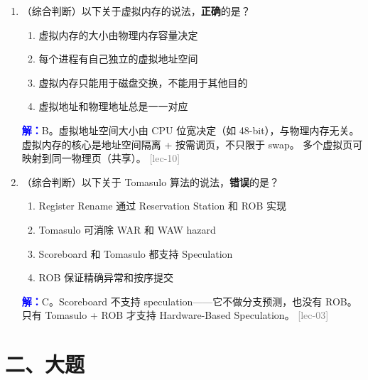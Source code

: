 \documentclass[11pt,a4paper]{article}
\newcommand{\ans}{\par\noindent\textcolor{blue}{\textbf{解：}}}
\newcommand{\lec}[1]{\textcolor{gray}{[lec-#1]}}
\begin{document}
\begin{enumerate}[leftmargin=*,itemsep=8pt]
  \begin{enumerate}[label=\Alph*.]
    \item 一个页表
    \item 一个缓存主存数据的 buffer（cache）
    \item 一个缓存虚拟地址到物理地址映射关系（PTE）的 buffer（cache）
    \item 一种页替换算法
  \end{enumerate}

  \ans C。TLB（Translation Lookaside Buffer）是页表的专用 cache，
  缓存最近使用过的 PTE（VPN $\to$ PPN 映射），加速地址翻译。
  它不存数据内容（B 错），不是页表本身（A 错），也不是替换算法（D 错）。 \lec{11}

\item （综合判断）以下关于虚拟内存的说法，\textbf{正确}的是？

  \begin{enumerate}[label=\Alph*.]
    \item 虚拟内存的大小由物理内存容量决定
    \item 每个进程有自己独立的虚拟地址空间
    \item 虚拟内存只能用于磁盘交换，不能用于其他目的
    \item 虚拟地址和物理地址总是一一对应
  \end{enumerate}

  \ans B。虚拟地址空间大小由 CPU 位宽决定（如 48-bit），与物理内存无关。
  虚拟内存的核心是地址空间隔离 + 按需调页，不只限于 swap。
  多个虚拟页可映射到同一物理页（共享）。 \lec{10}

\item （综合判断）以下关于 Tomasulo 算法的说法，\textbf{错误}的是？

  \begin{enumerate}[label=\Alph*.]
    \item Register Rename 通过 Reservation Station 和 ROB 实现
    \item Tomasulo 可消除 WAR 和 WAW hazard
    \item Scoreboard 和 Tomasulo 都支持 Speculation
    \item ROB 保证精确异常和按序提交
  \end{enumerate}

  \ans C。Scoreboard 不支持 speculation——它不做分支预测，也没有 ROB。
  只有 Tomasulo + ROB 才支持 Hardware-Based Speculation。 \lec{03}

\end{enumerate}

\newpage
\section*{二、大题}
\end{document}
